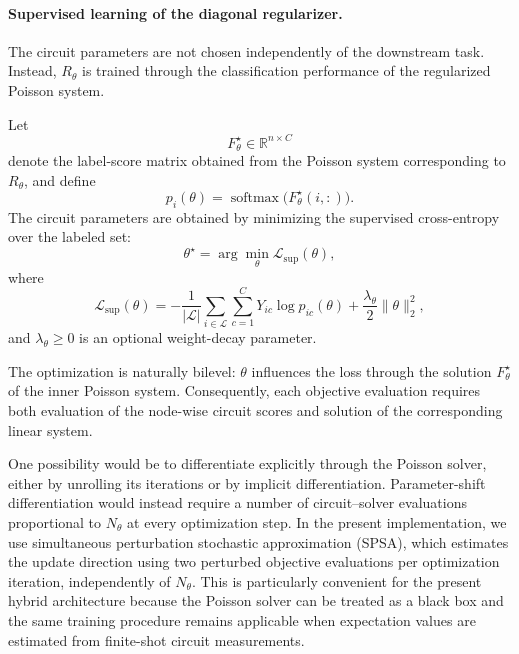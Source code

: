 \documentclass[11pt,a4paper]{article}
\begin{document}
\paragraph{Supervised learning of the diagonal regularizer.}

The circuit parameters are not chosen independently of the downstream task.
Instead, \(R_\theta\) is trained through the classification performance of the
regularized Poisson system.

Let
\[
F_\theta^\star
\in
\mathbb{R}^{n\times C}
\]
denote the label-score matrix obtained from the Poisson system corresponding
to \(R_\theta\), and define
\[
p_i(\theta)
=
\operatorname{softmax}
\bigl(
F_\theta^\star(i,:)
\bigr).
\]
The circuit parameters are obtained by minimizing the supervised
cross-entropy over the labeled set:
\begin{equation}
\theta^\star
=
\arg\min_\theta
\mathcal{L}_{\mathrm{sup}}(\theta),
\label{eq:theta_training}
\end{equation}
where
\begin{equation}
\mathcal{L}_{\mathrm{sup}}(\theta)
=
-\frac{1}{|\mathcal{L}|}
\sum_{i\in\mathcal{L}}
\sum_{c=1}^{C}
Y_{ic}\log p_{ic}(\theta)
+
\frac{\lambda_\theta}{2}
\|\theta\|_2^2,
\label{eq:supervised_quantum_loss}
\end{equation}
and \(\lambda_\theta\geq0\) is an optional weight-decay parameter.

The optimization is naturally bilevel: \(\theta\) influences the loss through
the solution \(F_\theta^\star\) of the inner Poisson system. Consequently,
each objective evaluation requires both evaluation of the node-wise circuit
scores and solution of the corresponding linear system.

One possibility would be to differentiate explicitly through the Poisson
solver, either by unrolling its iterations or by implicit differentiation.
Parameter-shift differentiation would instead require a number of
circuit--solver evaluations proportional to \(N_\theta\) at every
optimization step. In the present implementation, we use simultaneous
perturbation stochastic approximation (SPSA), which estimates the update
direction using two perturbed objective evaluations per optimization
iteration, independently of \(N_\theta\). This is particularly convenient for
the present hybrid architecture because the Poisson solver can be treated as
a black box and the same training procedure remains applicable when
expectation values are estimated from finite-shot circuit measurements.
\end{document}
